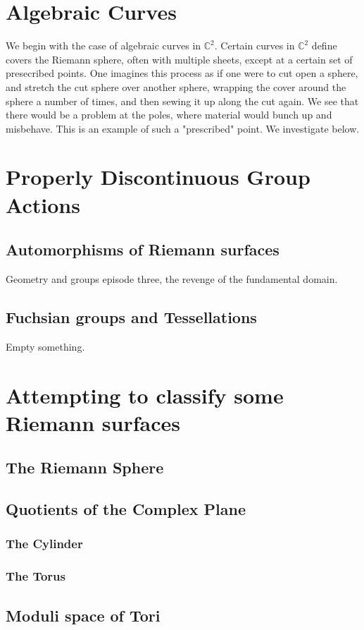 \documentclass[11pt]{report}
\theoremstyle{definition}
\begin{document}
\section{Algebraic Curves}\label{algcurv}
We begin with the case of algebraic curves in $\mathbb{C}^2$. Certain curves in $\mathbb{C}^2$ define covers the Riemann sphere, often with multiple sheets, except at a certain set of presecribed points. One imagines this process as if one were to cut open a sphere, and stretch the cut sphere over another sphere, wrapping the cover around the sphere a number of times, and then sewing it up along the cut again. We see that there would be a problem at the poles, where material would bunch up and misbehave. This is an example of such a "prescribed" point. We investigate below.

\section{Properly Discontinuous Group Actions}\label{PropDiscGrpAct}
\subsection{Automorphisms of Riemann surfaces}
Geometry and groups episode three, the revenge of the fundamental domain.
\subsection{Fuchsian groups and Tessellations}
Empty something.

\section{Attempting to classify some Riemann surfaces}
\subsection{The Riemann Sphere}
\subsection{Quotients of the Complex Plane}
\subsubsection{The Cylinder}
\subsubsection{The Torus}
\subsection{Moduli space of Tori}
\end{document}
